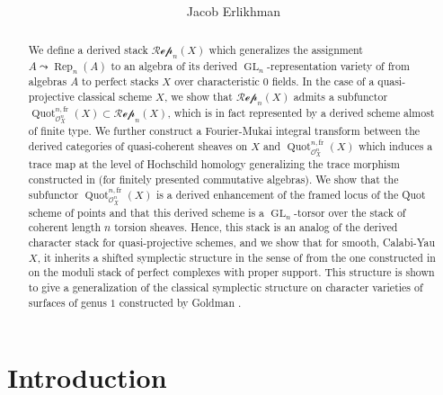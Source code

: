 \documentclass{article}
\title{\vspace{-50pt}
	\Huge \text{Representation Varieties of Stacks}\\ 
\text{and Trace Maps}}
\author{Jacob Erlikhman}
\date{}
\numberwithin{equation}{section}
\theoremstyle{quest}
\theoremstyle{definition}
\theoremstyle{remark}
\DeclareMathOperator{\GL}{GL}
\DeclareMathOperator{\Rep}{Rep}
\DeclareMathOperator{\Quot}{Quot}
\begin{document}
\maketitle
\begin{abstract}
	We define a derived stack $\mathscr{Rep}_n(X)$ which generalizes the assignment $A\leadsto \Rep_n(A)$ to an algebra of its derived $\GL_n$-representation variety of \cite{BKR} from algebras $A$ to perfect stacks $X$ over characteristic 0 fields. In the case of a quasi-projective classical scheme $X$, we show that $\mathscr{Rep}_n(X)$ admits a subfunctor $\Quot^{n,\text{fr}}_{\mathscr{O}_X^n}(X)\subset \mathscr{Rep}_n(X)$, which is in fact represented by a derived scheme almost of finite type. We further construct a Fourier-Mukai integral transform between the derived categories of quasi-coherent sheaves on $X$ and $\Quot^{n,\text{fr}}_{\mathscr{O}_X^n}(X)$ which induces a trace map at the level of Hochschild homology generalizing the trace morphism constructed in \cite{BKR} (for finitely presented commutative algebras). We show that the subfunctor $\Quot^{n,\text{fr}}_{\mathscr{O}_X^n}(X)$ is a derived enhancement of the framed locus of the Quot scheme of points and that this derived scheme is a $\GL_n$-torsor over the stack of coherent length $n$ torsion sheaves. Hence, this stack is an analog of the derived character stack for quasi-projective schemes, and we show that for smooth, Calabi-Yau $X$, it inherits a shifted symplectic structure in the sense of \cite{PTVV} from the one constructed in \cite{BD} on the moduli stack of perfect complexes with proper support. This structure is shown to give a generalization of the classical symplectic structure on character varieties of surfaces of genus $ 1$ constructed by Goldman \cite{gold}.
\end{abstract}
 
\tableofcontents
\section{Introduction}
\end{document}
